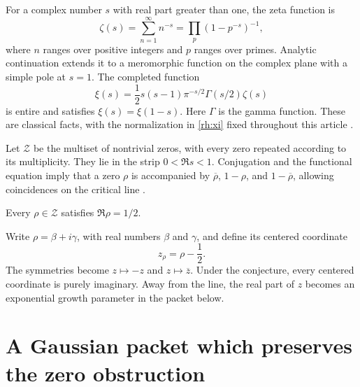 For a complex number \(s\) with real part greater than one, the zeta function is
\begin{equation}\label{rh:zeta}
\zeta(s)=\sum_{n=1}^{\infty}n^{-s}
=\prod_{p}(1-p^{-s})^{-1},
\end{equation}
where \(n\) ranges over positive integers and \(p\) ranges over primes. Analytic continuation extends it to a meromorphic function on the complex plane with a simple pole at \(s=1\). The completed function
\begin{equation}\label{rh:xi}
\xi(s)=\frac12s(s-1)\pi^{-s/2}\Gamma(s/2)\zeta(s)
\end{equation}
is entire and satisfies \(\xi(s)=\xi(1-s)\). Here \(\Gamma\) is the gamma function. These are classical facts, with the normalization in \eqref{rh:xi} fixed throughout this article \cite{DLMFZeta}.

Let \(\mathcal Z\) be the multiset of nontrivial zeros, with every zero repeated according to its multiplicity. They lie in the strip \(0<\Re s<1\). Conjugation and the functional equation imply that a zero \(\rho\) is accompanied by \(\overline\rho\), \(1-\rho\), and \(1-\overline\rho\), allowing coincidences on the critical line \cite{DLMFZeros}.

\begin{conjecture}\label{rh:conjecture}
Every \(\rho\in\mathcal Z\) satisfies \(\Re\rho=1/2\).
\end{conjecture}

Write \(\rho=\beta+i\gamma\), with real numbers \(\beta\) and \(\gamma\), and define its centered coordinate
\begin{equation}\label{rh:centered}
z_\rho=\rho-\frac12.
\end{equation}
The symmetries become \(z\mapsto-z\) and \(z\mapsto\overline z\). Under the conjecture, every centered coordinate is purely imaginary. Away from the line, the real part of \(z\) becomes an exponential growth parameter in the packet below.


\section{A Gaussian packet which preserves the zero obstruction}

